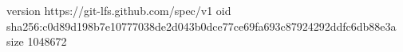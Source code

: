 version https://git-lfs.github.com/spec/v1
oid sha256:c0d89d198b7e10777038de2d043b0dce77ce69fa693c87924292ddfc6db88e3a
size 1048672
